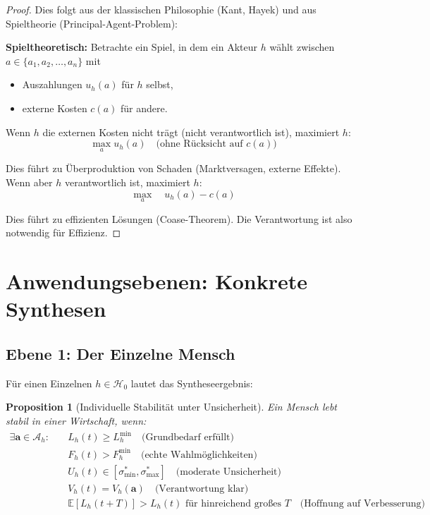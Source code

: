 \documentclass[a4paper, 12pt, twoside, openright]{report}
\newtheorem{proposition}[theorem]{Proposition}
\theoremstyle{definition}
\theoremstyle{definition}
\begin{document}
\begin{proof}
Dies folgt aus der klassischen Philosophie (Kant, Hayek) und aus Spieltheorie (Principal-Agent-Problem):

\textbf{Spieltheoretisch:} Betrachte ein Spiel, in dem ein Akteur $h$ wählt zwischen $a \in \{a_1, a_2, \ldots, a_n\}$ mit
\begin{itemize}
\item Auszahlungen $u_h(a)$ für $h$ selbst,
\item externe Kosten $c(a)$ für andere.
\end{itemize}

Wenn $h$ die externen Kosten nicht trägt (nicht verantwortlich ist), maximiert $h$:
\begin{equation}
\max_a u_h(a) \quad \text{(ohne Rücksicht auf $c(a)$)}
\end{equation}

Dies führt zu Überproduktion von Schaden (Marktversagen, externe Effekte). Wenn aber $h$ verantwortlich ist, maximiert $h$:
\begin{equation}
\max_a \quad u_h(a) - c(a)
\end{equation}

Dies führt zu effizienten Lösungen (Coase-Theorem). Die Verantwortung ist also notwendig für Effizienz.
\end{proof}

\section{Anwendungsebenen: Konkrete Synthesen}

\subsection{Ebene 1: Der Einzelne Mensch}

Für einen Einzelnen $h \in \mathcal{H}_0$ lautet das Syntheseergebnis:

\begin{proposition}[Individuelle Stabilität unter Unsicherheit]
Ein Mensch lebt stabil in einer Wirtschaft, wenn:
\begin{align}
\exists \mathbf{a} \in \mathcal{A}_h: \quad &L_h(t) \geq L_h^{\min} \quad \text{(Grundbedarf erfüllt)} \\
&F_h(t) > F_h^{\min} \quad \text{(echte Wahlmöglichkeiten)} \\
&U_h(t) \in [\sigma^*_{\min}, \sigma^*_{\max}] \quad \text{(moderate Unsicherheit)} \\
&V_h(t) = V_h(\mathbf{a}) \quad \text{(Verantwortung klar)} \\
&\mathbb{E}[L_h(t+T)] > L_h(t) \text{ für hinreichend großes } T \quad \text{(Hoffnung auf Verbesserung)}
\end{align}
\end{proposition}
\end{document}
